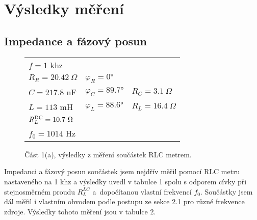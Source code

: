 \documentclass[a4paper,11pt]{article}
\begin{document}
\section{Výsledky měření}

\subsection{Impedance a fázový posun}

\begin{wrapfigure}[8]{tr}{0.5\textwidth}
    \vspace{-25pt}
    \begin{tabular}{lll}
        \hline \hline
        $f= 1 $ khz		&& \\
        $R_R= 20.42\ \Omega$	& $\varphi_R = 0°$	  & \\
        $C=217.8 $ nF		    & $\varphi_C = 89.7°$ & $R_C = 3.1\ \Omega$  \\
        $L=113 $ mH		    & $\varphi_L = 88.6°$ & $R_L = 16.4\ \Omega$ \\ \hline 
        $R^{\rm DC}_L=10.7\ \Omega$& \\
        \hline
        $f_0= 1014$ Hz		&& \\
        \hline \hline
    \end{tabular}
    \captionsetup{type=table}
    \caption{Část 1(a), výsledky z měření součástek RLC metrem.}
\end{wrapfigure}

Impedanci a fázový posun součástek jsem nejdřív měřil pomocí RLC metru nastaveného na 1 khz a výsledky uvedl v tabulce 1 spolu s odporem cívky při stejnosměrném proudu $ R_L^{LC} $ a~dopočítanou vlastní frekvencí $ f_0 $. Součástky jsem dál měřil i vlastním obvodem podle postupu ze sekce 2.1 pro různé frekvence zdroje. Výsledky tohoto měření jsou v tabulce 2.

\newpage

\vspace{-30pt}
\end{document}

